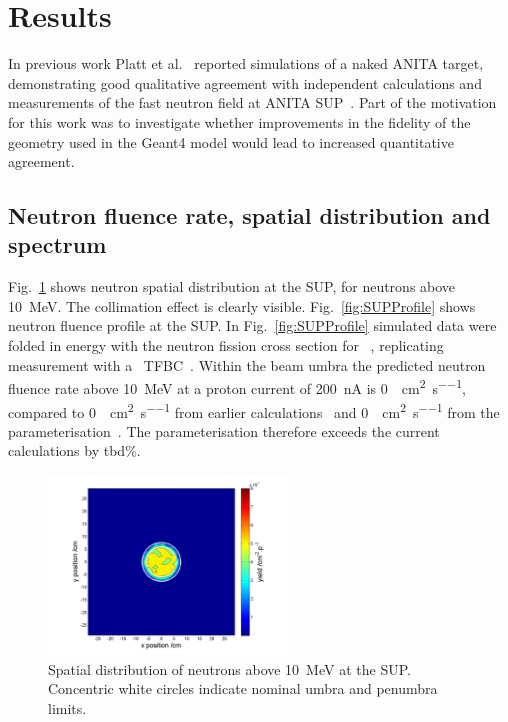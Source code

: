\documentclass[11pt,a4paper]{IEEEtran}
\let\MYoriglatexcaption\caption
\renewcommand{\caption}[2][\relax]{\MYoriglatexcaption[#2]{#2}}
\def\U238{\BPChem{\^{238}U}}
\begin{document}
\section{Results}
In previous work Platt et al.~\cite{Platt13} reported simulations of a naked ANITA target, demonstrating good qualitative agreement with independent calculations and measurements of the fast neutron field at ANITA SUP~\cite{Prokofiev2009}.
Part of the motivation for this work was to investigate whether improvements in the fidelity of the geometry used in the Geant4 model would lead to increased quantitative agreement.

\subsection{Neutron fluence rate, spatial distribution and spectrum}
Fig.~\ref{fig:SUPDensity} shows neutron spatial distribution at the SUP, for neutrons above \SI{10}{\MeV}.
The collimation effect is clearly visible.
Fig.~\ref{fig:SUPProfile} shows neutron fluence profile at the SUP.
In Fig.~\ref{fig:SUPProfile} simulated data were folded in energy with the neutron fission cross section for \U238~\cite{tbd}, replicating measurement with a \U238\ TFBC~\cite{Prokofiev2009}.
Within the beam umbra the predicted neutron fluence rate above \SI{10}{\MeV} at a proton current of \SI{200}{\nA} is \SI{0}{\neutron\per\cm\squared\per\second}, compared to \SI{0}{\neutron\per\cm\squared\per\second} from earlier calculations~\cite{Platt13} and \SI{0}{\neutron\per\cm\squared\per\second} from the parameterisation~\cite{Prokofiev2009}.
The parameterisation therefore exceeds the current calculations by tbd\%.

\begin{figure}[t]
    \includegraphics[width=2.5in]{SUP10ColSpatialDistribution10MeVRADECS.png}
    \caption{
        Spatial distribution of neutrons above \SI{10}{\MeV} at the SUP.
        Concentric white circles indicate nominal umbra and penumbra limits.
    }
    \label{fig:SUPDensity}
\end{figure}
\end{document}
